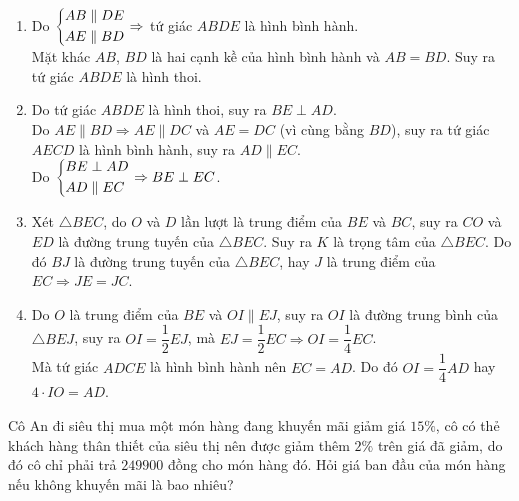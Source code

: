 \begin{bt}
{\begin{enumerate}
	\item Do $\left\{\begin{aligned}&AB\parallel DE\\&AE\parallel BD\end{aligned}\right. \Rightarrow $ tứ giác $ABDE$ là hình bình hành.\\
	Mặt khác $AB$, $BD$ là hai cạnh kề của hình bình hành và $AB=BD$. Suy ra tứ giác $ABDE$ là hình thoi.
	\item Do tứ giác $ABDE$ là hình thoi, suy ra $BE \perp AD$.\\ 
	Do $AE \parallel BD \Rightarrow AE \parallel DC $ và $AE=DC$ (vì cùng bằng $BD$), suy ra tứ giác $AECD$ là hình bình hành, suy ra $AD \parallel EC$.\\
	Do $\left\{\begin{aligned}& BE \perp AD\\& AD \parallel EC\end{aligned}\right. \Rightarrow BE \perp EC$.
	\item  Xét $\triangle BEC$, do $O$ và $D$ lần lượt là trung điểm của $BE$ và $BC$, suy ra $CO$ và $ED$ là đường trung tuyến của $\triangle BEC$. Suy ra $K$ là trọng tâm của $\triangle BEC$. Do đó $BJ$ là đường trung tuyến của $\triangle BEC$, hay $J$ là trung điểm của $EC \Rightarrow JE=JC$.
	\item Do $O$ là trung điểm của $BE$ và $OI \parallel EJ$, suy ra $OI$ là đường trung bình của $\triangle BEJ$, suy ra $OI=\dfrac{1}{2}EJ$, mà $EJ=\dfrac{1}{2}EC \Rightarrow OI=\dfrac{1}{4}EC$.\\
	Mà tứ giác $ADCE$ là hình bình hành nên $EC=AD$. Do đó $OI=\dfrac{1}{4}AD$ hay $4\cdot IO =AD$.
\end{enumerate}
	


}
\end{bt}
\begin{bt}%
	Cô An đi siêu thị mua một món hàng đang khuyến mãi giảm giá $15\% $, cô có thẻ khách hàng thân thiết của siêu thị nên được giảm thêm $2\%$ trên giá đã giảm, do đó cô chỉ phải trả $249900$ đồng cho món hàng đó. Hỏi giá ban đầu của món hàng nếu không khuyến mãi là bao nhiêu?
\end{bt}
